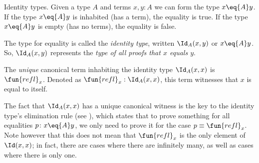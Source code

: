\begin{lpar}{Identity types.}
    Given a type $A$ and terms $x,y\colon A$ we can form the type $x \eq{A}  y$. If the type $x\eq{A} y$ is inhabited (has a term), the equality is true. If the type $x\eq{A} y$ is empty (has no terms), the equality is false.
    
    The type for equality is called the \textsl{identity type}, written $\Id_A(x,y)$ or $x\eq{A} y$. So, $\Id_A(x,y)$ represents the \textit{type of all proofs that\/ $x$ equals\/ $y$}.
    
    The \textit{unique} canonical term inhabiting the identity type\/ $\Id_A(x,x)$ is\/ $\fun{refl}_x$. Denoted as\/ $\fun{refl}_x : \Id_A(x,x)$, this term witnesses that\/ $x$ is equal to itself.
    
    The fact that $\Id_A(x,x)$ has a unique canonical witness is the key to the identity type's elimination rule (see ), which states that to prove something for all equalities $p\colon x\eq{A} y$, we only need to prove it for the case $p\equiv\fun{refl}_x$. Note however that this does not mean that $\fun{refl}_x$ is the only element of $\Id(x,x)$; in fact, there are cases where there are infinitely many, as well as cases where there is only one.
\end{lpar}

